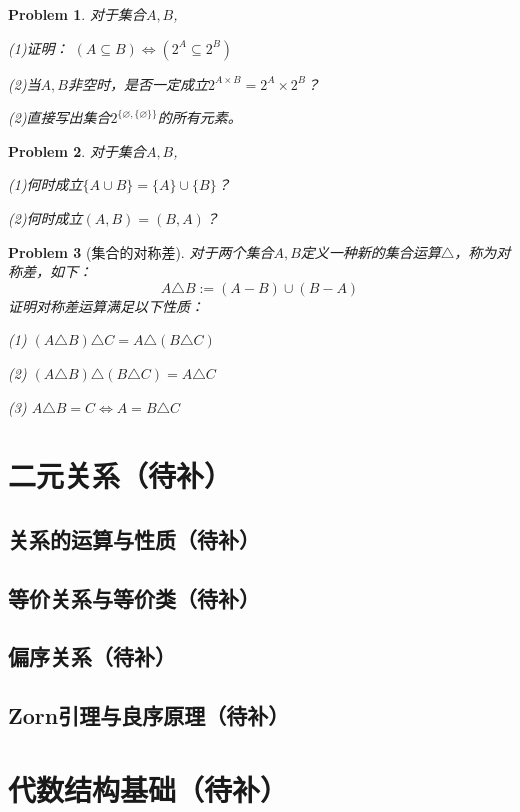 \documentclass[a4paper, 11pt]{article} %
\newcommand*{\vs}{\vspace{5pt}}
\newtheorem{prob}{Problem}[subsection]
\begin{document}
\begin{prob} 对于集合$A,B$,

(1)证明： $(A\subseteq B)\Leftrightarrow (2^A\subseteq 2^B)$

(2)当$A,B$非空时，是否一定成立$2^{A\times B}=2^A\times2^B$？

(2)直接写出集合$2^{\{\varnothing,\{\varnothing\}\}}$的所有元素。

\end{prob}\vs

\begin{prob}对于集合$A,B$,

(1)何时成立$\{A\cup B\}=\{A\}\cup\{B\}$？

(2)何时成立$(A,B)=(B,A)$？
\end{prob}\vs

\begin{prob}[集合的对称差]

对于两个集合$A,B$定义一种新的集合运算$\triangle$，称为对称差，如下：
$$A\triangle B:=(A-B)\cup(B-A)$$
证明对称差运算满足以下性质：

(1) $(A\triangle B)\triangle C=A\triangle(B\triangle C)$

(2) $(A\triangle B)\triangle (B\triangle C)=A\triangle C$

(3) $A\triangle B=C\Leftrightarrow A=B\triangle C$
\end{prob}



\section{二元关系（待补）}
\subsection{关系的运算与性质（待补）}
\subsection{等价关系与等价类（待补）}
\subsection{偏序关系（待补）}
\subsection{Zorn引理与良序原理（待补）}

\section{代数结构基础（待补）}
\end{document}
